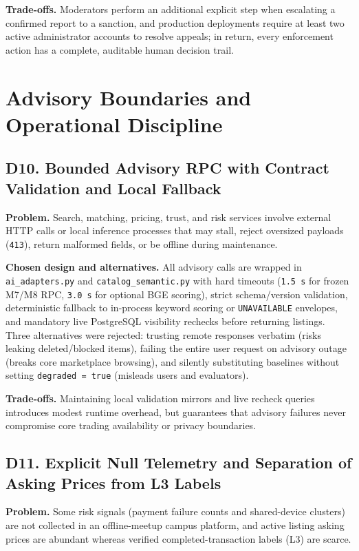 \textbf{Trade-offs.} Moderators perform an additional explicit step when escalating a confirmed report to a sanction, and production deployments require at least two active administrator accounts to resolve appeals; in return, every enforcement action has a complete, auditable human decision trail.

\section{Advisory Boundaries and Operational Discipline}
\label{sec:dec-advisory}

\subsection{D10. Bounded Advisory RPC with Contract Validation and Local Fallback}

\textbf{Problem.} Search, matching, pricing, trust, and risk services involve external HTTP calls or local inference processes that may stall, reject oversized payloads (\texttt{413}), return malformed fields, or be offline during maintenance.

\textbf{Chosen design and alternatives.} All advisory calls are wrapped in \texttt{ai\_adapters.py} and \texttt{catalog\_semantic.py} with hard timeouts (\texttt{1.5 s} for frozen M7/M8 RPC, \texttt{3.0 s} for optional BGE scoring), strict schema/version validation, deterministic fallback to in-process keyword scoring or \texttt{UNAVAILABLE} envelopes, and mandatory live PostgreSQL visibility rechecks before returning listings. Three alternatives were rejected: trusting remote responses verbatim (risks leaking deleted/blocked items), failing the entire user request on advisory outage (breaks core marketplace browsing), and silently substituting baselines without setting \texttt{degraded = true} (misleads users and evaluators).

\textbf{Trade-offs.} Maintaining local validation mirrors and live recheck queries introduces modest runtime overhead, but guarantees that advisory failures never compromise core trading availability or privacy boundaries.

\subsection{D11. Explicit Null Telemetry and Separation of Asking Prices from L3 Labels}

\textbf{Problem.} Some risk signals (payment failure counts and shared-device clusters) are not collected in an offline-meetup campus platform, and active listing asking prices are abundant whereas verified completed-transaction labels (L3) are scarce.

